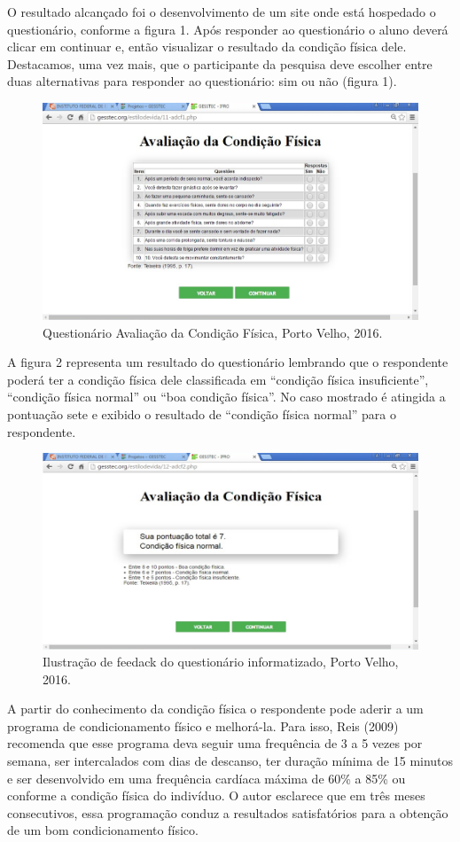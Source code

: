\documentclass[article,12pt,onesidea,4paper,english,brazil]{abntex2}
\begin{document}
	O resultado alcançado foi o desenvolvimento de um site onde está hospedado o questionário, conforme a figura 1. Após responder ao questionário o aluno deverá clicar em continuar e, então visualizar o resultado da condição física dele. Destacamos, uma vez mais, que o participante da pesquisa deve escolher entre duas alternativas para responder ao questionário: sim ou não (figura 1).
	
	\begin{figure}[h]
		\centering
		\includegraphics[width=0.7\linewidth]{pip13-1.png}
		\caption{Questionário Avaliação da Condição Física, Porto Velho, 2016.}
	\end{figure}
	
	A figura 2 representa um resultado do questionário lembrando que o respondente poderá ter a condição física dele classificada em “condição física insuficiente”, “condição física normal” ou “boa condição física”. No caso mostrado é atingida a pontuação sete e exibido o resultado de “condição física normal” para o respondente.
	
	\begin{figure}[h]
		\centering
		\includegraphics[width=0.7\linewidth]{pip13-2.png}
		\caption{Ilustração de feedack do questionário informatizado, Porto Velho, 2016.}
	\end{figure}

A partir do conhecimento da condição física o respondente pode aderir a um programa de condicionamento físico e melhorá-la. Para isso, Reis (2009) recomenda que esse programa deva seguir uma frequência de 3 a 5 vezes por semana, ser intercalados com dias de descanso, ter duração mínima de 15 minutos e ser desenvolvido em uma frequência cardíaca máxima de 60\% a 85\% ou conforme a condição física do indivíduo. O autor esclarece que em três meses consecutivos, essa programação conduz a resultados satisfatórios para a obtenção de um bom condicionamento físico.
	
\end{document}
